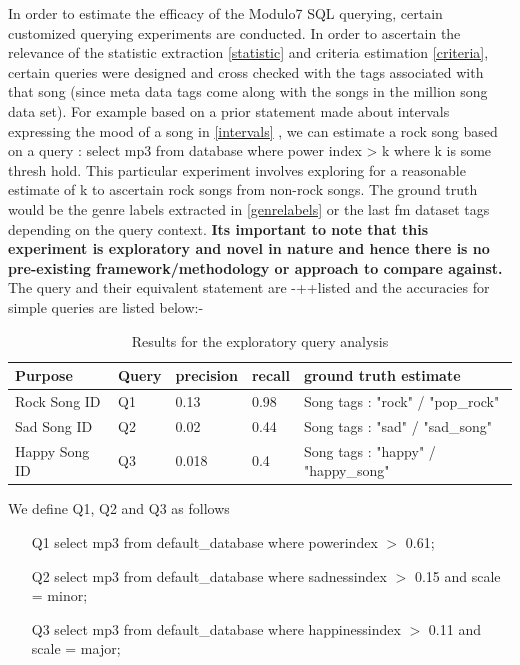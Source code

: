 \noindent In order to estimate the efficacy of the Modulo7 SQL querying, certain customized querying experiments are conducted. In order to ascertain the relevance of the statistic extraction \ref{statistic} and criteria estimation \ref{criteria}, certain queries were designed and cross checked with the tags associated with that song (since meta data tags come along with the songs in the million song data set). For example based on a prior statement made about intervals expressing the mood of a song in \ref{intervals} , we can estimate a rock song based on a query : select mp3 from database where power index > k where k is some thresh hold. This particular experiment involves exploring for a reasonable estimate of k to ascertain rock songs from non-rock songs. The ground truth would be the genre labels extracted in \ref{genrelabels} or the last fm dataset tags \cite{msd} depending on the query context. \textbf{Its important to note that this experiment is exploratory and novel in nature and hence there is no pre-existing framework/methodology or approach to compare against.}\\

\noindent The query and their equivalent statement are -++listed and the accuracies for simple queries are listed below:- \\

\begin{table}[h]
\begin{center}
    \begin{tabular}{| l | l | l | l | l |}
    \hline
    Purpose &  Query & precision  & recall & ground truth estimate \\ \hline
    Rock Song ID &  Q1 & 0.13  & 0.98 & Song tags : "rock" / "pop\_rock" \\ \hline
    Sad Song ID &  Q2 & 0.02  & 0.44 & Song tags : "sad" / "sad\_song" \\ \hline
    Happy Song ID &  Q3 & 0.018  & 0.4 & Song tags : "happy" / "happy\_song" \\
    \hline
    \end{tabular}
\end{center}
\caption{Results for the exploratory query analysis}
\end{table}

\noindent We define Q1, Q2 and Q3 as follows

\begin{enumerate}
\item [Q1] select mp3 from default\_database where powerindex $>$ 0.61;
\item [Q2] select mp3 from default\_database where sadnessindex $>$ 0.15 and scale = minor;
\item [Q3] select mp3 from default\_database where happinessindex $>$ 0.11 and scale = major;
\end{enumerate}

